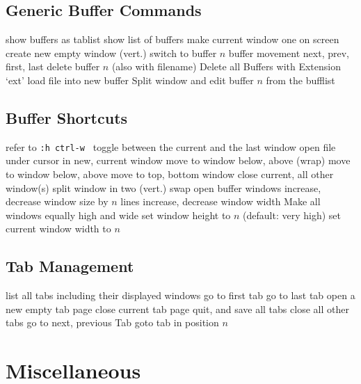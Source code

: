 \subsection{Generic Buffer Commands}	{}
	{show buffers as tablist}
	{show list of buffers}
	{make current window one on screen}
	{create new empty window (vert.)}
	{switch to buffer $n$}
	{buffer movement next, prev, first, last}
	{delete buffer $n$ (also with filename)}
	{Delete all Buffers with Extension `ext'}
	{load file into new buffer}
	{Split window and edit buffer $n$ from the bufflist}

\subsection{Buffer Shortcuts}	{refer to {\tt :h ctrl-w }}
\cmdS{\ctrl \^{} }	{toggle between the current and the last window}
	{open file under cursor in new, current window}
	{move to window below, above (wrap)}
	{move to window below, above}
	{move to top, bottom window}
	{close current, all other window(s)}
	{split window in two (vert.)}
	{swap open buffer windows }
	{increase, decrease window size by $n$ lines}
	{increase, decrease window width}
	{Make all windows equally high and wide}
	{set window height to $n$ (default: very high) }
	{set current window width to $n$ }

\subsection{Tab Management}	{}
	{list all tabs including their displayed windows}
	{go to first tab}
	{go to last tab}
	{open a new empty tab page}
	{close current tab page}
	{quit, and save all tabs}
	{close all other tabs}
	{go to next, previous Tab}
	{goto tab in position $n$ }

\section{Miscellaneous}	{}
